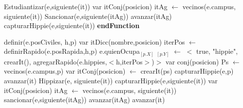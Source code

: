 \begin{algorithm}[H]
\begin{algorithmic}[1]			
					 
						\State Estudiantizar(e,siguiente(it)) 
					\Else
						 
							\State var itConj(posicion) itAg $\gets$ vecinos(e.campus, siguiente(it)) 
								 
									\State Sancionar(e,siguiente(itAg)) 
								\EndIf
								\State avanzar(itAg)	
							\EndWhile
						\Else
							 
								\State	capturarHippie(e,siguiente(it))  
							\EndIf
						\EndIf
					\EndIf
				\EndWhile
			\EndIf
\textbf{endFunction}
\end{algorithmic}
\end{algorithm}

\begin{algorithm}[H]
\begin{algorithmic}[1]
 
	\State definir(e.posCiviles, h,p) 
	\State var itDicc(nombre,posicion) iterPos $\gets$ definirRapido(e.posRapida,h,p) 
	\State e.quienOcupa$_{[p.X]}$ $_{[p.Y]}$ $\gets$ $<$ true, "hippie", crearIt(), agregarRapido(e.hippies,$<$h,iterPos$>$)$>$ 
	\State var conj(posicion) Ps $\gets$ vecinos(e.campus,p) 
	\State var itConj(posicion) $\gets$ crearIt(ps) 
	 
		\State capturarHippie(e,p) 
	\Else
		 
			 
				\State avanzar(it) 
			\Else
				 
					\State Hippizar(e, siguiente(it)) 
						 
						\State capturarHippie(e,siguiente(it))  
					\EndIf 
				\Else 
					 
						\State var itConj(posicion) itAg $\gets$ vecinos(e.campus, siguiente(it)) 
						 
							 
								\State sancionar(e,siguiente(itAg)) 
							\EndIf
							\State avanzar(itAg)	
						\EndWhile
   					 \EndIf
				\EndIf
			\EndIf
			\State avanzar(it)	
		\EndWhile
	\EndIf
\EndFunction
\end{algorithmic}
\end{algorithm}

